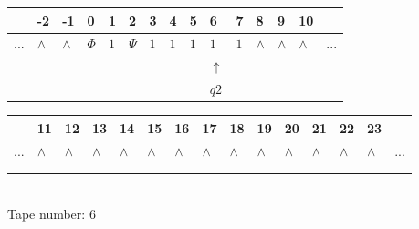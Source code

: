 \documentclass[11pt]{article}
\begin{document}
\begin{table}[H]
\centering
\begin{tabular}{lllllllllllllll}
 & -2 & -1 & 0 & 1 & 2 & 3 & 4 & 5 & 6 & 7 & 8 & 9 & 10 & \\
\hline
$...$ & \multicolumn{1}{|l|}{$\wedge$} & \multicolumn{1}{|l|}{$\wedge$} & \multicolumn{1}{|l|}{$\Phi$} & \multicolumn{1}{|l|}{$1$} & \multicolumn{1}{|l|}{$\Psi$} & \multicolumn{1}{|l|}{$1$} & \multicolumn{1}{|l|}{$1$} & \multicolumn{1}{|l|}{$1$} & \multicolumn{1}{|l|}{$1$} & \multicolumn{1}{|l|}{$1$} & \multicolumn{1}{|l|}{$\wedge$} & \multicolumn{1}{|l|}{$\wedge$} & \multicolumn{1}{|l|}{$\wedge$} & $...$\\
\hline
&  &  &  &  &  &  &  &  & $\uparrow$ &  &  &  &  &  \\
&  &  &  &  &  &  &  &  & $ q2 $ &  &  &  &  &  \\
\end{tabular}
\begin{tabular}{lllllllllllllll}
 & 11 & 12 & 13 & 14 & 15 & 16 & 17 & 18 & 19 & 20 & 21 & 22 & 23 & \\
\hline
$...$ & \multicolumn{1}{|l|}{$\wedge$} & \multicolumn{1}{|l|}{$\wedge$} & \multicolumn{1}{|l|}{$\wedge$} & \multicolumn{1}{|l|}{$\wedge$} & \multicolumn{1}{|l|}{$\wedge$} & \multicolumn{1}{|l|}{$\wedge$} & \multicolumn{1}{|l|}{$\wedge$} & \multicolumn{1}{|l|}{$\wedge$} & \multicolumn{1}{|l|}{$\wedge$} & \multicolumn{1}{|l|}{$\wedge$} & \multicolumn{1}{|l|}{$\wedge$} & \multicolumn{1}{|l|}{$\wedge$} & \multicolumn{1}{|l|}{$\wedge$} & $...$\\
\hline
&  &  &  &  &  &  &  &  &  &  &  &  &  &  \\
&  &  &  &  &  &  &  &  &  &  &  &  &  &  \\
\end{tabular}
\\
Tape number: 6
\noindent\makebox[\linewidth]{\hdashrule{\textwidth}{1pt}{1pt}}\end{table}
\end{document}
